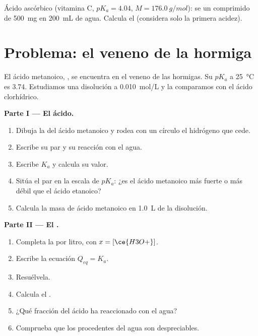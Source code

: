 \begin{exercise}[$\star\star\star$]\label{exo:g12:ka-and-pka:15}
Ácido ascórbico (vitamina C, $pK_a = 4.04$, $M = \qty{176.0}{g/mol}$): se
 un comprimido de \qty{500}{mg} en \qty{200}{mL} de agua. Calcula
el  (considera solo la primera acidez).
\end{exercise}

\section{Problema: el veneno de la hormiga}


\begin{problem}
\label{pb:g12:ka-and-pka:1}
El ácido metanoico, , se encuentra en el veneno de las
hormigas. Su $pK_a$ a \qty{25}{\celsius} es 3.74. Estudiamos una
disolución a \qty{0.010}{mol/L} y la comparamos con el ácido clorhídrico.

\medskip
\noindent\textbf{Parte I --- El ácido.}
\begin{enumerate}
  \item Dibuja la  del ácido metanoico y rodea con un
        círculo el hidrógeno que cede.
  \item Escribe su par y su reacción con el agua.
  \item Escribe $K_a$ y calcula su valor.
  \item Sitúa el par en la escala de $pK_a$: ¿es el ácido metanoico más
        fuerte o más débil que el ácido etanoico?
  \item Calcula la masa de ácido metanoico en \qty{1.0}{L} de la
        disolución.
\end{enumerate}

\medskip
\noindent\textbf{Parte II --- El .}
\begin{enumerate}[resume]
  \item Completa la  por litro, con $x = [\ce{H3O+}]$.
  \item Escribe la ecuación $Q_{eq} = K_a$.
  \item Resuélvela.
  \item Calcula el .
  \item ¿Qué fracción del ácido ha reaccionado con el agua?
  \item Comprueba que los  procedentes del agua son despreciables.
\end{enumerate}


\end{problem}
